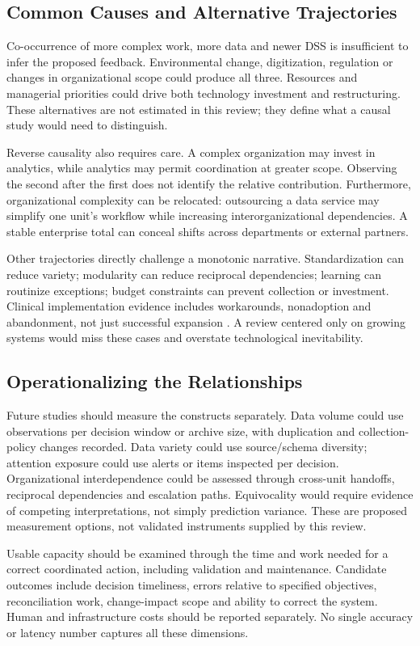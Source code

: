 \documentclass[journal]{IEEEtran}
\begin{document}
\subsection{Common Causes and Alternative Trajectories}
Co-occurrence of more complex work, more data and newer DSS is insufficient to infer the proposed feedback. Environmental change, digitization, regulation or changes in organizational scope could produce all three. Resources and managerial priorities could drive both technology investment and restructuring. These alternatives are not estimated in this review; they define what a causal study would need to distinguish.

Reverse causality also requires care. A complex organization may invest in analytics, while analytics may permit coordination at greater scope. Observing the second after the first does not identify the relative contribution. Furthermore, organizational complexity can be relocated: outsourcing a data service may simplify one unit's workflow while increasing interorganizational dependencies. A stable enterprise total can conceal shifts across departments or external partners.

Other trajectories directly challenge a monotonic narrative. Standardization can reduce variety; modularity can reduce reciprocal dependencies; learning can routinize exceptions; budget constraints can prevent collection or investment. Clinical implementation evidence includes workarounds, nonadoption and abandonment, not just successful expansion \cite{Greenhalgh2017}. A review centered only on growing systems would miss these cases and overstate technological inevitability.

\subsection{Operationalizing the Relationships}
Future studies should measure the constructs separately. Data volume could use observations per decision window or archive size, with duplication and collection-policy changes recorded. Data variety could use source/schema diversity; attention exposure could use alerts or items inspected per decision. Organizational interdependence could be assessed through cross-unit handoffs, reciprocal dependencies and escalation paths. Equivocality would require evidence of competing interpretations, not simply prediction variance. These are proposed measurement options, not validated instruments supplied by this review.

Usable capacity should be examined through the time and work needed for a correct coordinated action, including validation and maintenance. Candidate outcomes include decision timeliness, errors relative to specified objectives, reconciliation work, change-impact scope and ability to correct the system. Human and infrastructure costs should be reported separately. No single accuracy or latency number captures all these dimensions.
\end{document}
